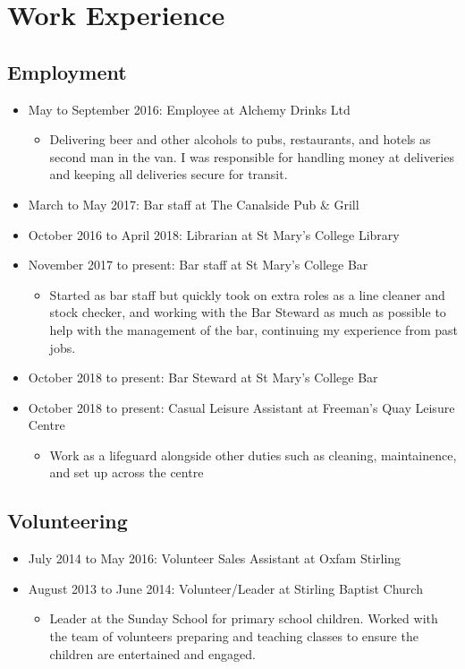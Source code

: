 \documentclass[10pt, a4paper]{article}
\begin{document}
\section{Work Experience}
	\subsection{Employment}
	\begin{itemize}
		\item May to September 2016: Employee at Alchemy Drinks Ltd
		\begin{itemize}
			\item Delivering beer and other alcohols to pubs, restaurants, and hotels as second man in the van. I was responsible for handling money at deliveries and keeping all deliveries secure for transit. 
		\end{itemize}
		\item March to May 2017: Bar staff at The Canalside Pub \& Grill
		\item October 2016 to April 2018: Librarian at St Mary's College Library
		\item November 2017 to present: Bar staff at St Mary's College Bar
    		\begin{itemize}
    			\item Started as bar staff but quickly took on extra roles as a line cleaner and stock checker, and working with the Bar Steward as much as possible to help with the management of the bar, continuing my experience from past jobs.
    		\end{itemize}
        \item October 2018 to present: Bar Steward at St Mary's College Bar
        \item October 2018 to present: Casual Leisure Assistant at Freeman's Quay Leisure Centre
            \begin{itemize}
                \item Work as a lifeguard alongside other duties such as cleaning, maintainence, and set up across the centre
            \end{itemize}
	\end{itemize}

	\subsection{Volunteering}
	\begin{itemize}
		\item July 2014 to May 2016: Volunteer Sales Assistant at Oxfam Stirling
		\item August 2013 to June 2014: Volunteer/Leader at Stirling Baptist Church
		\begin{itemize}
			\item Leader at the Sunday School for primary school children. Worked with the team of volunteers preparing and teaching classes to ensure the children are entertained and engaged.
		\end{itemize}
	\end{itemize}
\end{document}
